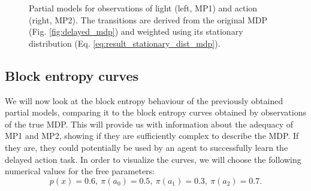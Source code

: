 \documentclass[12pt,a4paper]{article}
\begin{document}
\begin{figure}[H]
    \centering
    \caption{\label{fig:partial_mps} Partial models for observations of light (left, MP1) and action (right, MP2). The transitions are derived from the original MDP (Fig. \ref{fig:delayed_mdp}) and weighted using its stationary distribution (Eq. \ref{eq:result_stationary_dist_mdp}).}
\end{figure}

\subsection{Block entropy curves} \label{ssec:res_block_entropy_curves}
We will now look at the block entropy behaviour of the previously obtained partial models, comparing it to the block entropy curves obtained by observations of the true MDP.
This will provide us with information about the adequacy of MP1 and MP2, showing if they are sufficiently complex to describe the MDP.
If they are, they could potentially be used by an agent to successfully learn the delayed action task.
In order to visualize the curves, we will choose the following numerical values for the free parameters:
\begin{equation}
    \label{eq:numerical_params}
    p(x)=0.6,\ \pi(a_0)=0.5,\ \pi(a_1)=0.3,\ \pi(a_2)=0.7.
\end{equation}
\end{document}
